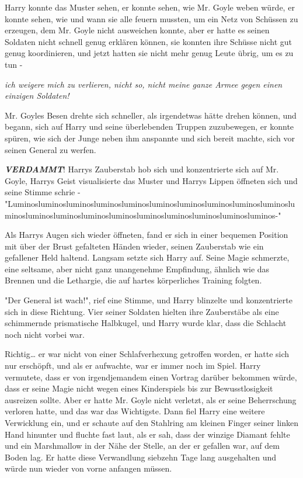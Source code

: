{Harry konnte das Muster sehen, er konnte sehen, wie Mr. Goyle weben würde, er konnte sehen, wie und wann sie alle feuern mussten, um ein Netz von Schüssen zu erzeugen, dem Mr. Goyle nicht ausweichen konnte, aber er hatte es seinen Soldaten nicht schnell genug erklären können, sie konnten ihre Schüsse nicht gut genug koordinieren, und jetzt hatten sie nicht mehr genug Leute übrig, um es zu tun -

\emph{ich weigere mich zu verlieren, nicht so, nicht meine ganze Armee gegen einen einzigen Soldaten!}

Mr. Goyles Besen drehte sich schneller, als irgendetwas hätte drehen können, und begann, sich auf Harry und seine überlebenden Truppen zuzubewegen, er konnte spüren, wie sich der Junge neben ihm anspannte und sich bereit machte, sich vor seinen General zu werfen.

\textbf{\emph{VERDAMMT}}! Harrys Zauberstab hob sich und konzentrierte sich auf Mr. Goyle, Harrys Geist visualisierte das Muster und Harrys Lippen öffneten sich und seine Stimme schrie - "Luminosluminosluminosluminosluminosluminosluminosluminosluminosluminosluminosluminosluminosluminosluminosluminosluminosluminosluminosluminos-"

Als Harrys Augen sich wieder öffneten, fand er sich in einer bequemen Position mit über der Brust gefalteten Händen wieder, seinen Zauberstab wie ein gefallener Held haltend. Langsam setzte sich Harry auf. Seine Magie schmerzte, eine seltsame, aber nicht ganz unangenehme Empfindung, ähnlich wie das Brennen und die Lethargie, die auf hartes körperliches Training folgten.

"Der General ist wach!", rief eine Stimme, und Harry blinzelte und konzentrierte sich in diese Richtung. Vier seiner Soldaten hielten ihre Zauberstäbe als eine schimmernde prismatische Halbkugel, und Harry wurde klar, dass die Schlacht noch nicht vorbei war.

Richtig… er war nicht von einer Schlafverhexung getroffen worden, er hatte sich nur erschöpft, und als er aufwachte, war er immer noch im Spiel. Harry vermutete, dass er von irgendjemandem einen Vortrag darüber bekommen würde, dass er seine Magie nicht wegen eines Kinderspiels bis zur Bewusstlosigkeit ausreizen sollte. Aber er hatte Mr. Goyle nicht verletzt, als er seine Beherrschung verloren hatte, und das war das Wichtigste. Dann fiel Harry eine weitere Verwicklung ein, und er schaute auf den Stahlring am kleinen Finger seiner linken Hand hinunter und fluchte fast laut, als er sah, dass der winzige Diamant fehlte und ein Marshmallow in der Nähe der Stelle, an der er gefallen war, auf dem Boden lag. Er hatte diese Verwandlung siebzehn Tage lang ausgehalten und würde nun wieder von vorne anfangen müssen.

}

